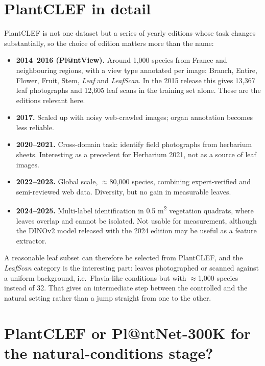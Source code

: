 \documentclass[11pt,a4paper]{article}
\begin{document}
\endgroup

\section*{PlantCLEF in detail}

PlantCLEF is not one dataset but a series of yearly editions whose task changes
substantially, so the choice of edition matters more than the name:

\begin{itemize}[leftmargin=1.4em,itemsep=0.2em,topsep=0.2em]
  \item \textbf{2014--2016 (Pl@ntView).} Around 1,000 species from France and
        neighbouring regions, with a view type annotated per image: Branch,
        Entire, Flower, Fruit, Stem, \textit{Leaf} and \textit{LeafScan}. In
        the 2015 release this gives 13,367 leaf photographs and 12,605 leaf
        scans in the training set alone. These are the editions relevant here.
  \item \textbf{2017.} Scaled up with noisy web-crawled images; organ
        annotation becomes less reliable.
  \item \textbf{2020--2021.} Cross-domain task: identify field photographs from
        herbarium sheets. Interesting as a precedent for Herbarium 2021, not as
        a source of leaf images.
  \item \textbf{2022--2023.} Global scale, $\approx$80,000 species, combining
        expert-verified and semi-reviewed web data. Diversity, but no gain in
        measurable leaves.
  \item \textbf{2024--2025.} Multi-label identification in 0.5 m\textsuperscript{2}
        vegetation quadrats, where leaves overlap and cannot be isolated. Not
        usable for measurement, although the DINOv2 model released with the
        2024 edition may be useful as a feature extractor.
\end{itemize}

A reasonable leaf subset can therefore be selected from PlantCLEF, and the
\textit{LeafScan} category is the interesting part: leaves photographed or
scanned against a uniform background, i.e.\ Flavia-like conditions but with
$\approx$1,000 species instead of 32. That gives an intermediate step between
the controlled and the natural setting rather than a jump straight from one to
the other.

\section*{PlantCLEF or Pl@ntNet-300K for the natural-conditions stage?}
\end{document}
